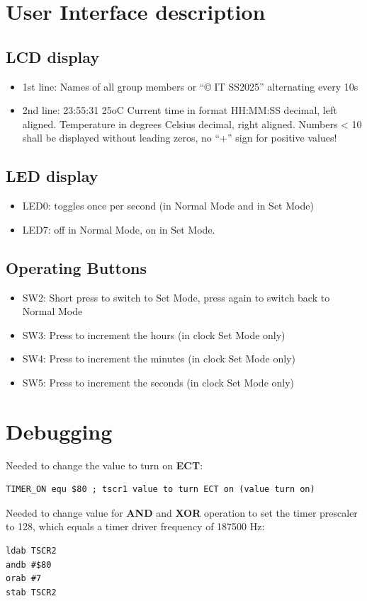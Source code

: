 \documentclass[a4paper,12pt]{article}
\begin{document}
\newpage
\section{User Interface description}
\subsection{LCD display}
\begin{itemize}
  \item 1st line: Names of all group members or “© IT SS2025” alternating every 10s
  \item 2nd line: 23:55:31 25oC Current time in format HH:MM:SS decimal, left aligned.
  Temperature in degrees Celsius decimal, right aligned. Numbers < 10 shall be displayed
  without leading zeros, no “+” sign for positive values!
\end{itemize}
\subsection{LED display}
\begin{itemize}
  \item LED0: toggles once per second (in Normal Mode and in Set Mode)
  \item LED7: off in Normal Mode, on in Set Mode.
\end{itemize}
\subsection{Operating Buttons}
\begin{itemize}
  \item SW2: Short press to switch to Set Mode, press again to switch back to Normal Mode
  \item SW3: Press to increment the hours (in clock Set Mode only)
  \item SW4: Press to increment the minutes (in clock Set Mode only)
  \item SW5: Press to increment the seconds (in clock Set Mode only)
\end{itemize}

\newpage
\section{Debugging}
Needed to change the value to turn on \textbf{ECT}:
\begin{lstlisting}
TIMER_ON equ $80 ; tscr1 value to turn ECT on (value turn on)
\end{lstlisting}
Needed to change value for \textbf{AND} and \textbf{XOR} operation to set the timer prescaler to 128,
which equals a timer driver frequency of 187500 Hz:
\begin{lstlisting}
ldab TSCR2
andb #$80
orab #7
stab TSCR2
\end{lstlisting}
\newpage
\end{document}
